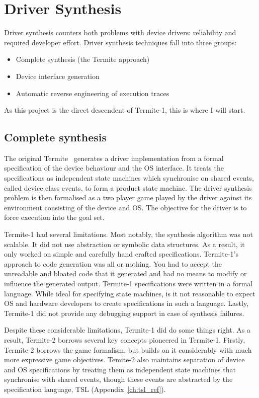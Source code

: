 \section{Driver Synthesis}

Driver synthesis counters both problems with device drivers: reliability and required developer effort. Driver synthesis techniques fall into three groups:
\begin{itemize}
    \item Complete synthesis (the Termite approach)
    \item Device interface generation
    \item Automatic reverse engineering of execution traces
\end{itemize}

As this project is the direct descendent of Termite-1, this is where I will start.

\subsection{Complete synthesis}

The original Termite~\cite{Ryzhyk_CKSH_09} generates a driver implementation from a formal specification of the device behaviour and the OS interface. It treats the specifications as independent state machines which synchronise on shared events, called device class events, to form a product state machine. The driver synthesis problem is then formalised as a two player game played by the driver against its environment consisting of the device and OS. The objective for the driver is to force execution into the goal set. 

Termite-1 had several limitations. Most notably, the synthesis algorithm was not scalable. It did not use abstraction or symbolic data structures. As a result, it only worked on simple and carefully hand crafted specifications. Termite-1's approach to code generation was all or nothing. You had to accept the unreadable and bloated code that it generated and had no means to modify or influence the generated output. Termite-1 specifications were written in a formal language. While ideal for specifying state machines, is it not reasonable to expect OS and hardware developers to create specifications in such a language. Lastly, Termite-1 did not provide any debugging support in case of synthesis failures.

Despite these considerable limitations, Termite-1 did do some things right. As a result, Termite-2 borrows several key concepts pioneered in Termite-1. Firstly, Termite-2 borrows the game formalism, but builds on it considerably with much more expressive game objectives. Temite-2 also maintains separation of device and OS specifications by treating them as independent state machines that synchronise with shared events, though these events are abstracted by the specification language, TSL (Appendix~\ref{ch:tsl_ref}).

